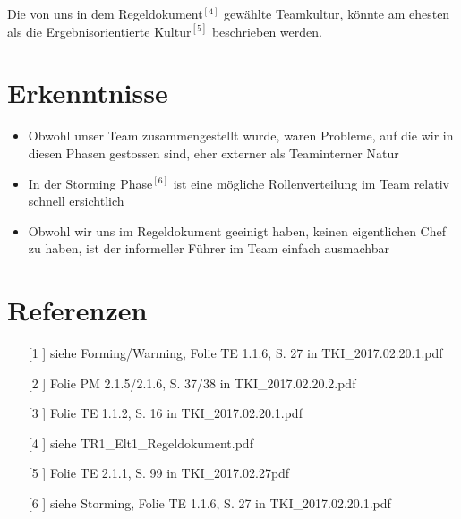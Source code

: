 \documentclass[12pt]{article}
\begin{document}
Die von uns in dem Regeldokument$^{[4]}$ gewählte Teamkultur, könnte am ehesten als die Ergebnisorientierte Kultur$^{[5]}$ beschrieben werden.



\section{Erkenntnisse}
\begin{itemize}
\item Obwohl unser Team zusammengestellt wurde, waren Probleme, auf die wir in diesen Phasen gestossen sind, eher externer als Teaminterner Natur
\item In der Storming Phase$^{[6]}$ ist eine mögliche Rollenverteilung im Team relativ schnell ersichtlich
\item Obwohl wir uns im Regeldokument geeinigt haben, keinen eigentlichen Chef zu haben, ist der informeller Führer im Team einfach ausmachbar
\end{itemize}


 \section{Referenzen}
 
 
\begin{itemize}
\item[[1]] siehe Forming/Warming, Folie TE 1.1.6, S. 27 in TKI{\_}2017.02.20.1.pdf
\item[[2]] Folie PM	2.1.5/2.1.6, S. 37/38 in TKI{\_}2017.02.20.2.pdf
\item[[3]] Folie TE 1.1.2, S. 16 in TKI{\_}2017.02.20.1.pdf
\item[[4]] siehe TR1{\_}Elt1{\_}Regeldokument.pdf 
\item[[5]] Folie TE 2.1.1, S. 99 in TKI{\_}2017.02.27pdf
\item[[6]] siehe Storming, Folie TE 1.1.6, S. 27 in TKI{\_}2017.02.20.1.pdf
\end{itemize}
 
\end{document}
